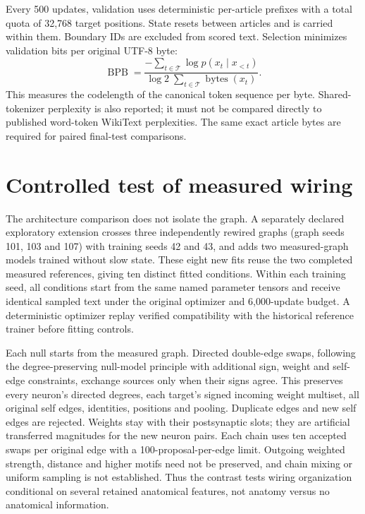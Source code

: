 \documentclass[10pt]{article}
\begin{document}
Every 500 updates, validation uses deterministic per-article prefixes with a total quota of 32,768 target positions. State resets between articles and is carried within them. Boundary IDs are excluded from scored text. Selection minimizes validation bits per original UTF-8 byte:
\begin{equation}
\operatorname{BPB}=\frac{-\sum_{t\in\mathcal T}\log p(x_t\mid x_{<t})}{\log 2\;\sum_{t\in\mathcal T}\operatorname{bytes}(x_t)}.
\end{equation}
This measures the codelength of the canonical token sequence per byte. Shared-tokenizer perplexity is also reported; it must not be compared directly to published word-token WikiText perplexities. The same exact article bytes are required for paired final-test comparisons.

\section{Controlled test of measured wiring}
The architecture comparison does not isolate the graph. A separately declared exploratory extension crosses three independently rewired graphs (graph seeds 101, 103 and 107) with training seeds 42 and 43, and adds two measured-graph models trained without slow state. These eight new fits reuse the two completed measured references, giving ten distinct fitted conditions. Within each training seed, all conditions start from the same named parameter tensors and receive identical sampled text under the original optimizer and 6,000-update budget. A deterministic optimizer replay verified compatibility with the historical reference trainer before fitting controls.

Each null starts from the measured graph. Directed double-edge swaps, following the degree-preserving null-model principle \cite{maslov2002} with additional sign, weight and self-edge constraints, exchange sources only when their signs agree. This preserves every neuron's directed degrees, each target's signed incoming weight multiset, all original self edges, identities, positions and pooling. Duplicate edges and new self edges are rejected. Weights stay with their postsynaptic slots; they are artificial transferred magnitudes for the new neuron pairs. Each chain uses ten accepted swaps per original edge with a 100-proposal-per-edge limit. Outgoing weighted strength, distance and higher motifs need not be preserved, and chain mixing or uniform sampling is not established. Thus the contrast tests wiring organization conditional on several retained anatomical features, not anatomy versus no anatomical information.
\end{document}
